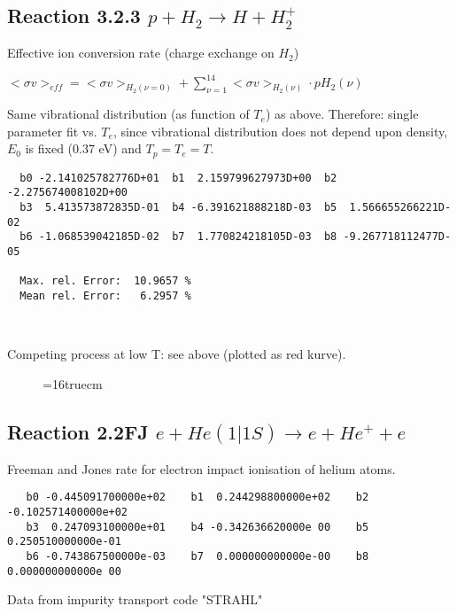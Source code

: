 \documentclass[12pt]{article}
\begin{document}
\subsection{
Reaction 3.2.3   $p + H_2 \rightarrow H + H_2^+  $
}

  Effective ion conversion rate (charge exchange on $H_2$)

  $ <\sigma v>_{eff} = <\sigma v>_{H_2(\nu=0)} + \sum_{\nu=1}^{14}
<\sigma v>_{H_2(\nu)} \cdot pH_2(\nu) $

  Same vibrational distribution (as function of $T_e$) as above.
  Therefore:
  single parameter fit vs. $T_e$,
  since vibrational distribution does not depend upon density, $E_0$ is fixed
  (0.37 eV) and $T_p = T_e = T$.

\begin{small}\begin{verbatim}
  b0 -2.141025782776D+01  b1  2.159799627973D+00  b2 -2.275674008102D+00
  b3  5.413573872835D-01  b4 -6.391621888218D-03  b5  1.566655266221D-02
  b6 -1.068539042185D-02  b7  1.770824218105D-03  b8 -9.267718112477D-05

  Max. rel. Error:  10.9657 %
  Mean rel. Error:   6.2957 %



\end{verbatim}\end{small}
Competing process at low T: see above (plotted as red kurve).
\begin{figure} \label{3.2.3}
\epsfxsize=16truecm
\end{figure}
\newpage


\subsection{
Reaction 2.2FJ  $e + He(1|1S) \rightarrow e + He^+ + e$
}
Freeman and Jones rate for electron impact ionisation of helium atoms.

\begin{small}\begin{verbatim}
   b0 -0.445091700000e+02    b1  0.244298800000e+02    b2 -0.102571400000e+02
   b3  0.247093100000e+01    b4 -0.342636620000e 00    b5  0.250510000000e-01
   b6 -0.743867500000e-03    b7  0.000000000000e-00    b8  0.000000000000e 00
\end{verbatim}\end{small}

Data from impurity transport code "STRAHL" \cite{kn:Behringer}
\end{document}
